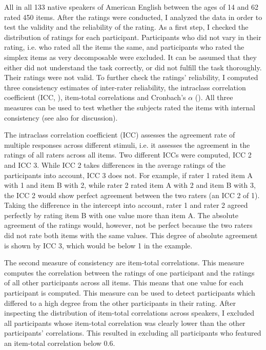 All in all 133 native speakers of American English between the ages of 14 and 62 rated 450 items. 
After the ratings were conducted, I analyzed the data in order to test the validity and the reliability of the rating. As a first step, I checked the distribution of ratings for each participant. Participants who did not vary in their rating, i.e. who rated all the items the same, and participants who rated the simplex items as very decomposable were excluded. It can be assumed that they either did not understand the task correctly, or did not fulfill the task thoroughly. Their ratings were not valid.
To further check the ratings' reliability, I computed three consistency estimates of inter-rater reliability, the intraclass correlation coefficient (ICC, \citealt{Bartko.1966}), item-total correlations and Cronbach's $\alpha$ (\citealt{Cronbach.1951}). All three measures can be used to test whether the subjects rated the items with internal consistency (see also \citealt[38 ff.]{Stemler.2008} for discussion). 

The intraclass correlation coefficient (ICC) assesses the agreement rate of multiple responses across different stimuli, i.e. it assesses the agreement in the ratings of all raters across all items. Two different ICCs were computed, ICC 2 and ICC 3. While ICC 2 takes differences in the average ratings of the participants into account, ICC 3 does not. For example, if rater 1 rated item A with 1 and item B with 2, while rater 2 rated item A with 2 and item B with 3, the ICC 2 would show perfect agreement between the two raters (an ICC 2 of 1). Taking the difference in the intercept into account, rater 1 and rater 2 agreed perfectly by rating item B with one value more than item A. The absolute agreement of the ratings would, however, not be perfect because the two raters did not rate both items with the same values. This degree of absolute agreement is shown by ICC 3, which would be below 1 in the example.

The second measure of consistency are item-total correlations. This measure computes the correlation between the ratings of one participant and the ratings of all other participants across all items. This means that one value for each participant is computed. This measure can be used to detect participants which differed to a high degree from the other participants in their rating. After inspecting the distribution of item-total correlations across speakers, I excluded all participants whose item-total correlation was clearly lower than the other participants' correlations. This resulted in excluding all participants who featured an item-total correlation below 0.6. 

